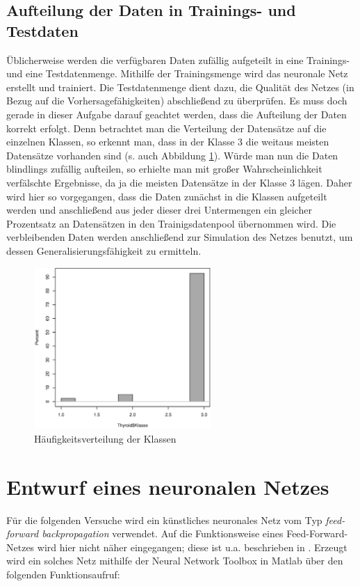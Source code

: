 \subsection{Aufteilung der Daten in Trainings- und Testdaten}
Üblicherweise werden die verfügbaren Daten zufällig aufgeteilt in eine 
Trainings- und eine Testdatenmenge. Mithilfe der Trainingsmenge wird das 
neuronale Netz erstellt und trainiert. Die Testdatenmenge dient dazu, die 
Qualität des Netzes (in Bezug auf die Vorhersagefähigkeiten) abschließend zu 
überprüfen. Es muss doch gerade in dieser Aufgabe darauf geachtet werden, dass 
die Aufteilung der Daten korrekt erfolgt. Denn betrachtet man die Verteilung 
der Datensätze auf die einzelnen Klassen, so erkennt man, dass in der Klasse 3 
die weitaus meisten Datensätze vorhanden sind (s. auch Abbildung 
\ref{fig:klassen-verteilung}). Würde man nun die Daten blindlings zufällig 
aufteilen, so erhielte man mit großer Wahrscheinlichkeit verfälschte 
Ergebnisse, da ja die meisten Datensätze in der Klasse 3 lägen. Daher wird hier 
so vorgegangen, dass die Daten zunächst in die Klassen aufgeteilt werden und 
anschließend aus jeder dieser drei Untermengen ein gleicher Prozentsatz an Datensätzen 
in den Trainigsdatenpool übernommen wird. Die verbleibenden Daten werden 
anschließend zur Simulation des Netzes benutzt, um 
dessen Generalisierungsfähigkeit zu ermitteln.

\begin{figure}
  \centering
  \includegraphics[width=0.6\textwidth]{../images/klassen-verteilung}
  \caption{Häufigkeitsverteilung der Klassen}
  \label{fig:klassen-verteilung}
\end{figure}

\section{Entwurf eines neuronalen Netzes}
Für die folgenden Versuche wird ein künstliches neuronales Netz vom Typ
\emph{feed-forward backpropagation} verwendet. Auf die Funktionsweise eines
Feed-Forward-Netzes wird hier nicht näher eingegangen; diese ist u.a. 
beschrieben in \cite{Demuth1998}. Erzeugt wird ein solches Netz mithilfe der 
Neural Network Toolbox in Matlab über den folgenden Funktionsaufruf:

